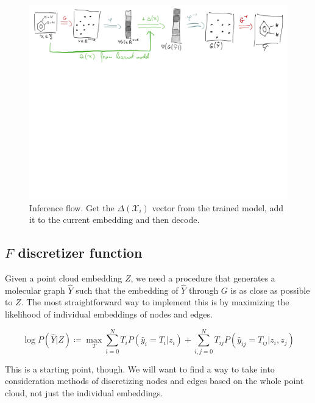 \documentclass{article}
\begin{document}
\begin{figure}[h!t]
    \label{fig:infer}
    \begin{center}
        \includegraphics[page=2,width=\textwidth, trim=0 40cm 0 0 ,clip,angle=0]{images/model_outline_infer.png}
        \caption{Inference flow. Get the $\Delta(\mathcal{X}_i)$ vector from the trained model, add it to the current embedding and then decode.}
    \end{center}
\end{figure}

\subsection{$F$ discretizer function}

Given a point cloud embedding $Z$, we need a procedure that generates a molecular graph $\hat{Y}$ such that the embedding of $\hat{Y}$ through $G$ is as close as possible to $Z$. The most straightforward way to implement this is by maximizing the likelihood of individual embeddings of nodes and edges.

\[\log P(\hat{Y}|Z) \coloneqq \max_{T}\sum_{i=0}^{N}T_i P(\hat{y}_i = T_i | z_i) + \sum_{i,j=0}^{N} T_{ij}P(\hat{y}_{ij} = T_{ij} | z_i, z_j)\]

This is a starting point, though. We will want to find a way to take into consideration methods of discretizing nodes and edges based on the whole point cloud, not just the individual embeddings.
\end{document}
